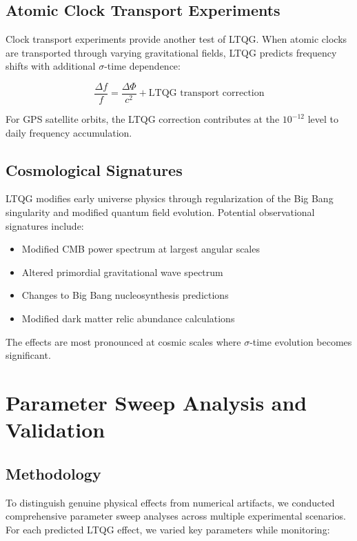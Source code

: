 \documentclass[12pt,a4paper]{article}
\begin{document}
\subsection{Atomic Clock Transport Experiments}

Clock transport experiments provide another test of LTQG. When atomic clocks are transported through varying gravitational fields, LTQG predicts frequency shifts with additional $\sigma$-time dependence:

\begin{equation}
\frac{\Delta f}{f} = \frac{\Delta \Phi}{c^2} + \text{LTQG transport correction}
\end{equation}

For GPS satellite orbits, the LTQG correction contributes at the $10^{-12}$ level to daily frequency accumulation.

\subsection{Cosmological Signatures}

LTQG modifies early universe physics through regularization of the Big Bang singularity and modified quantum field evolution. Potential observational signatures include:

\begin{itemize}
\item Modified CMB power spectrum at largest angular scales
\item Altered primordial gravitational wave spectrum
\item Changes to Big Bang nucleosynthesis predictions
\item Modified dark matter relic abundance calculations
\end{itemize}

The effects are most pronounced at cosmic scales where $\sigma$-time evolution becomes significant.

\section{Parameter Sweep Analysis and Validation}

\subsection{Methodology}

To distinguish genuine physical effects from numerical artifacts, we conducted comprehensive parameter sweep analyses across multiple experimental scenarios. For each predicted LTQG effect, we varied key parameters while monitoring:
\end{document}

